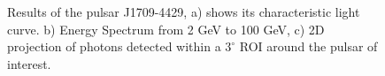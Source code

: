 \documentclass{PoS}
\begin{document}
\begin{figure}
{}
\caption{Results of the pulsar J1709-4429, a)  shows its characteristic  light curve. b) Energy Spectrum from 2 GeV to 100 GeV, c) 2D projection of photons detected within a $ 3^{\circ}$ ROI around the pulsar of interest.}\label{j1709}
\end{figure}
\end{document}
